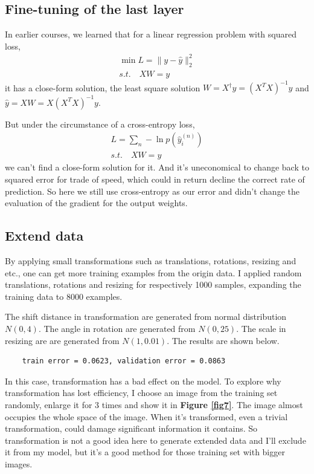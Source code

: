 \documentclass{article}
\begin{document}
\subsection{Fine-tuning of the last layer}

In earlier courses, we learned that for a linear regression problem with squared loss,
\[
\begin{aligned}
\min L=\|y-\hat{y}\|_2^2 \\
s.t.\quad XW=y
\end{aligned}
\]
it has a close-form solution, the least square solution $W=X^{\dag}y=(X^TX)^{-1}y$ and $\hat{y}=XW=X(X^TX)^{-1}y$.\par
But under the circumstance of a cross-entropy loss,
\[
\begin{aligned}
L=\sum_n-\ln p(\hat{y}_i^{(n)})\\
s.t.\quad XW=y
\end{aligned}
\]
we can't find a close-form solution for it. And it's uneconomical to change back to squared error for trade of speed, which could in return decline the correct rate of prediction. So here we still use cross-entropy as our error and didn't change the evaluation of the gradient for the output weights.

\subsection{Extend data}

By applying small transformations such as translations, rotations,
resizing and etc., one can get more training examples from the origin data. I applied random translations, rotations and resizing for respectively 1000 samples, expanding the training data to 8000 examples. \par
The shift distance in transformation are generated from normal distribution $N(0,4)$. The angle in rotation are generated from $N(0,25)$. The scale in resizing are are generated from $N(1,0.01)$. The results are shown below.

\begin{commandline}
	\begin{verbatim}
	train error = 0.0623, validation error = 0.0863
	\end{verbatim}
\end{commandline}

In this case, transformation has a bad effect on the model. To explore why transformation has lost efficiency, I choose an image from the training set randomly, enlarge it for 3 times and show it in \textbf{Figure \ref{fig7}}. The image almost occupies the whole space of the image. When it's transformed, even a trivial transformation, could damage significant information it contains. So transformation is not a good idea here to generate extended data and I'll exclude it from my model, but it's a good method for those training set with bigger images.
\end{document}
